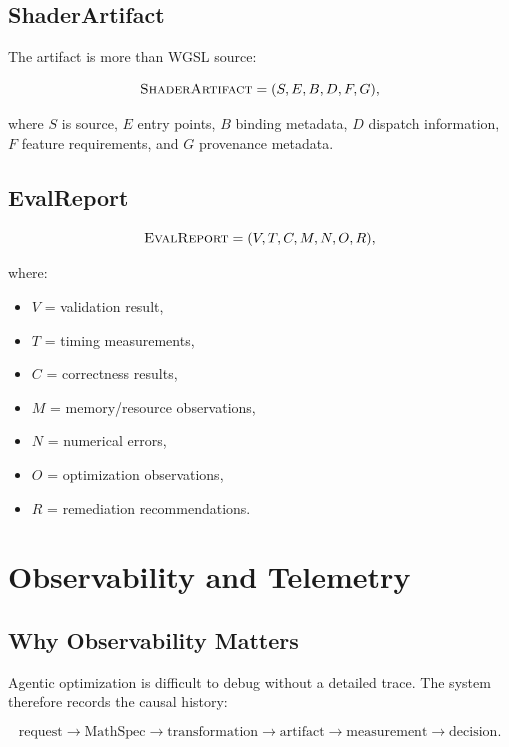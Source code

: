 \documentclass[11pt,a4paper,oneside]{report}
\newcommand{\ShaderArtifact}{\textsc{ShaderArtifact}}
\newcommand{\EvalReport}{\textsc{EvalReport}}
\begin{document}
\section{ShaderArtifact}

The artifact is more than WGSL source:

\begin{equation}
\ShaderArtifact=
(
S,
E,
B,
D,
F,
G
),
\end{equation}

where $S$ is source, $E$ entry points, $B$ binding metadata, $D$ dispatch information,
$F$ feature requirements, and $G$ provenance metadata.

\section{EvalReport}

\begin{equation}
\EvalReport=
(
V,
T,
C,
M,
N,
O,
R
),
\end{equation}

where:

\begin{itemize}
  \item $V$ = validation result,
  \item $T$ = timing measurements,
  \item $C$ = correctness results,
  \item $M$ = memory/resource observations,
  \item $N$ = numerical errors,
  \item $O$ = optimization observations,
  \item $R$ = remediation recommendations.
\end{itemize}

\chapter{Observability and Telemetry}

\section{Why Observability Matters}

Agentic optimization is difficult to debug without a detailed trace. The system therefore records
the causal history:

\[
\text{request}
\rightarrow
\text{MathSpec}
\rightarrow
\text{transformation}
\rightarrow
\text{artifact}
\rightarrow
\text{measurement}
\rightarrow
\text{decision}.
\]
\end{document}

